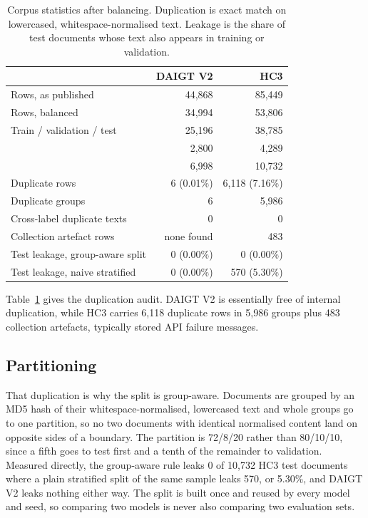 \begin{table}[!ht]
\centering
\caption{Corpus statistics after balancing. Duplication is exact match on lowercased, whitespace-normalised text. Leakage is the share of test documents whose text also appears in training or validation.}
\label{tab:corpora}
\footnotesize
\setlength{\tabcolsep}{3.5pt}
\begin{tabular}{@{}lrr@{}}
\toprule
& DAIGT V2 & HC3 \\
\midrule
Rows, as published & 44,868 & 85,449 \\
Rows, balanced & 34,994 & 53,806 \\
Train / validation / test & 25,196 & 38,785 \\
& 2,800 & 4,289 \\
& 6,998 & 10,732 \\
\midrule
Duplicate rows & 6 (0.01\%) & 6,118 (7.16\%) \\
Duplicate groups & 6 & 5,986 \\
Cross-label duplicate texts & 0 & 0 \\
Collection artefact rows & none found & 483 \\
\midrule
Test leakage, group-aware split & 0 (0.00\%) & 0 (0.00\%) \\
Test leakage, naive stratified & 0 (0.00\%) & 570 (5.30\%) \\
\bottomrule
\end{tabular}
\end{table}

Table~\ref{tab:corpora} gives the duplication audit. DAIGT V2 is essentially free of internal duplication, while HC3 carries 6,118 duplicate rows in 5,986 groups plus 483 collection artefacts, typically stored API failure messages.

\subsection{Partitioning}

That duplication is why the split is group-aware. Documents are grouped by an MD5 hash of their whitespace-normalised, lowercased text and whole groups go to one partition, so no two documents with identical normalised content land on opposite sides of a boundary. The partition is 72/8/20 rather than 80/10/10, since a fifth goes to test first and a tenth of the remainder to validation. Measured directly, the group-aware rule leaks 0 of 10,732 HC3 test documents where a plain stratified split of the same sample leaks 570, or 5.30\%, and DAIGT V2 leaks nothing either way. The split is built once and reused by every model and seed, so comparing two models is never also comparing two evaluation sets.

